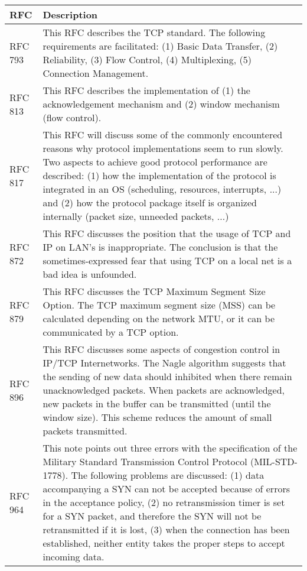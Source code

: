 
\begin{longtable}{ | l | p{13cm} | }
\hline
{\bf RFC} &
{\bf Description} \\ \hline

RFC 793 &
This RFC describes the TCP standard. The following requirements are facilitated:
(1) Basic Data Transfer, (2) Reliability, (3) Flow Control, (4) Multiplexing, (5) Connection Management. \\ \hline

RFC 813 &
This RFC describes the implementation of (1) the acknowledgement mechanism and (2) window mechanism (flow control). \\ \hline

RFC 817 &
This RFC will discuss  some  of  the  commonly  encountered   reasons   why   protocol implementations seem to run slowly. Two aspects to achieve good protocol performance are described: (1) how the implementation of the protocol is integrated in an OS (scheduling, resources, interrupts, ...) and (2) how  the  protocol  package itself  is  organized  internally (packet size, unneeded packets, ...) \\ \hline

RFC 872 &
This RFC discusses the position that the usage of TCP and IP on LAN's is inappropriate. The conclusion is that the sometimes-expressed fear that using TCP on a local net is a bad idea is unfounded. \\ \hline

RFC 879 &
This RFC discusses the TCP Maximum Segment Size Option. The TCP maximum segment size (MSS) can be calculated depending on the network MTU, or it can be communicated by a TCP option. \\ \hline

RFC 896 &
This RFC discusses some aspects of congestion control in IP/TCP Internetworks. The Nagle algorithm suggests that the sending of new data should inhibited when there remain unacknowledged packets. When packets are acknowledged, new packets in the buffer can be transmitted (until the window size). This scheme reduces the amount of small packets transmitted. \\ \hline

RFC 964 &
This note points out three errors with the specification of the Military Standard Transmission Control Protocol (MIL-STD-1778). The following problems are discussed:
(1) data accompanying a SYN can not be accepted because of errors in the acceptance policy, (2) no retransmission timer is set for a SYN packet, and therefore the SYN will not be retransmitted if it is lost, (3) when the connection has been established, neither entity takes the proper steps to accept incoming data. \\ \hline


\end{longtable}
